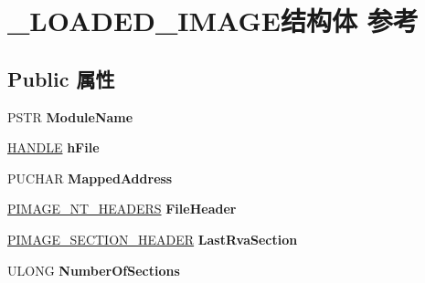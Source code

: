 \hypertarget{struct___l_o_a_d_e_d___i_m_a_g_e}{}\section{\+\_\+\+L\+O\+A\+D\+E\+D\+\_\+\+I\+M\+A\+G\+E结构体 参考}
\label{struct___l_o_a_d_e_d___i_m_a_g_e}
\subsection*{Public 属性}
\begin{DoxyCompactItemize}
\item 
\mbox{\label{struct___l_o_a_d_e_d___i_m_a_g_e_a9d7d7e9913f4f73191726207a5ee17b9}} 
P\+S\+TR {\bfseries Module\+Name}
\item 
\mbox{\label{struct___l_o_a_d_e_d___i_m_a_g_e_a81fd9bf1255c9e57275cddc4a5e60a50}} 
\hyperlink{interfacevoid}{H\+A\+N\+D\+LE} {\bfseries h\+File}
\item 
\mbox{\label{struct___l_o_a_d_e_d___i_m_a_g_e_a7049e90c986b90231c10c412e4b0bcf2}} 
P\+U\+C\+H\+AR {\bfseries Mapped\+Address}
\item 
\mbox{\label{struct___l_o_a_d_e_d___i_m_a_g_e_a123509d138f880fb84ee8db696e76e01}} 
\hyperlink{struct___i_m_a_g_e___n_t___h_e_a_d_e_r_s}{P\+I\+M\+A\+G\+E\+\_\+\+N\+T\+\_\+\+H\+E\+A\+D\+E\+RS} {\bfseries File\+Header}
\item 
\mbox{\label{struct___l_o_a_d_e_d___i_m_a_g_e_a8893da648ee89dafd9540f5e3b815809}} 
\hyperlink{struct___i_m_a_g_e___s_e_c_t_i_o_n___h_e_a_d_e_r}{P\+I\+M\+A\+G\+E\+\_\+\+S\+E\+C\+T\+I\+O\+N\+\_\+\+H\+E\+A\+D\+ER} {\bfseries Last\+Rva\+Section}
\item 
\mbox{\label{struct___l_o_a_d_e_d___i_m_a_g_e_a964ae6bf7d4cf3354c3cc1bc71ade047}} 
U\+L\+O\+NG {\bfseries Number\+Of\+Sections}
\item 
\mbox{\label{struct___l_o_a_d_e_d___i_m_a_g_e_a154308186768c229a6b396209b2bc6eb}} 

\end{DoxyCompactItemize}
